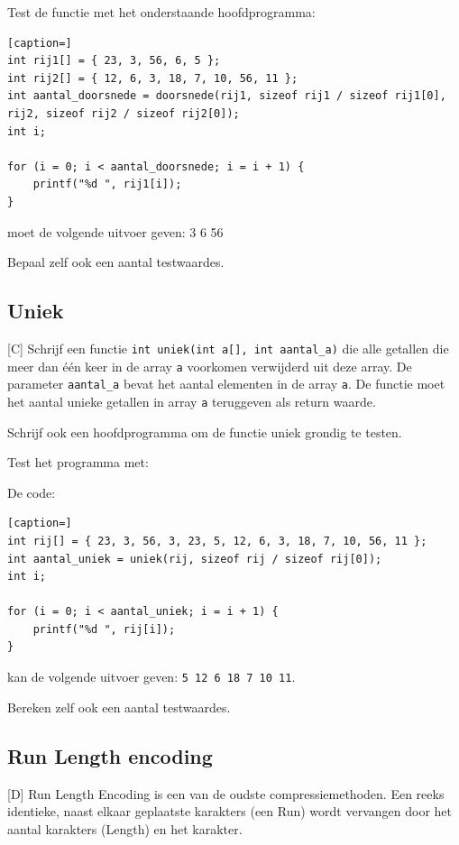 \documentclass[a4paper,10pt,fleqn,twoside]{article}
\begin{document}

Test de functie met het onderstaande hoofdprogramma:

\begin{lstlisting}[caption=]
int rij1[] = { 23, 3, 56, 6, 5 };
int rij2[] = { 12, 6, 3, 18, 7, 10, 56, 11 }; 
int aantal_doorsnede = doorsnede(rij1, sizeof rij1 / sizeof rij1[0], rij2, sizeof rij2 / sizeof rij2[0]);
int i;

for (i = 0; i < aantal_doorsnede; i = i + 1) {
	printf("%d ", rij1[i]);
} 
\end{lstlisting}

moet de volgende uitvoer geven:
3 6 56

Bepaal zelf ook een aantal testwaardes.

\subsection{Uniek}[C]
Schrijf een functie \lstinline|int uniek(int a[], int aantal_a)| die alle getallen die meer dan één keer in de array \lstinline|a| voorkomen verwijderd uit deze array. De parameter \lstinline|aantal_a| bevat het aantal elementen in de array \lstinline|a|. De functie moet het aantal unieke getallen in array \lstinline|a| teruggeven als return waarde.

Schrijf ook een hoofdprogramma om de functie uniek grondig te testen.

Test het programma met:

De code:

\begin{lstlisting}[caption=]
int rij[] = { 23, 3, 56, 3, 23, 5, 12, 6, 3, 18, 7, 10, 56, 11 }; 
int aantal_uniek = uniek(rij, sizeof rij / sizeof rij[0]);
int i;

for (i = 0; i < aantal_uniek; i = i + 1) {
	printf("%d ", rij[i]);
} 
\end{lstlisting}

kan de volgende uitvoer geven:
\lstinline|5 12 6 18 7 10 11|.

Bereken zelf ook een aantal testwaardes.

\subsection{Run Length encoding}[D]
Run Length Encoding is een van de oudste compressiemethoden. Een reeks identieke, naast elkaar geplaatste karakters (een Run) wordt vervangen door het aantal karakters (Length) en het karakter.
\end{document}
